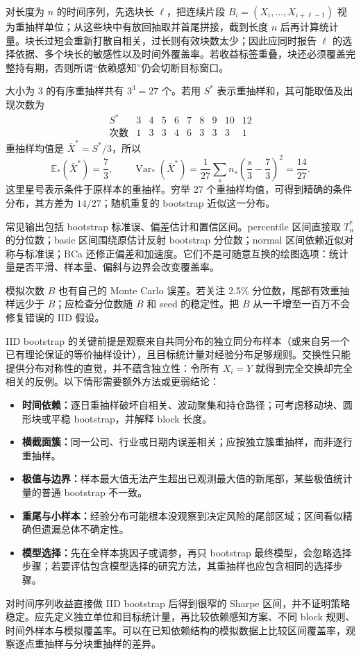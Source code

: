 对长度为 $n$ 的时间序列，先选块长 $\ell$，把连续片段
$B_i=(X_i,\ldots,X_{i+\ell-1})$ 视为重抽样单位；从这些块中有放回抽取并首尾拼接，截到长度 $n$ 后再计算统计量。块长过短会重新打散自相关，过长则有效块数太少；因此应同时报告 $\ell$ 的选择依据、多个块长的敏感性以及时间外覆盖率。若收益标签重叠，块还必须覆盖完整持有期，否则所谓“依赖感知”仍会切断目标窗口。


大小为 3 的有序重抽样共有 $3^3=27$ 个。若用 $S^*$ 表示重抽样和，其可能取值及出现次数为
\[
\begin{array}{c|rrrrrrrrr}
S^*&3&4&5&6&7&8&9&10&12\\\hline
\text{次数}&1&3&3&4&6&3&3&3&1
\end{array}
\]
重抽样均值是 $\bar X^*=S^*/3$，所以
\[
  \mathbb E_*(\bar X^*)=\frac73,
  \qquad
  \operatorname{Var}_*(\bar X^*)
  =\frac1{27}\sum_s n_s\left(\frac{s}{3}-\frac73\right)^2
  =\frac{14}{27}.
\]
这里星号表示条件于原样本的重抽样。穷举 27 个重抽样均值，可得到精确的条件分布，其方差为 $14/27$；随机重复的 bootstrap 近似这一分布。


常见输出包括 bootstrap 标准误、偏差估计和置信区间。percentile 区间直接取 $T_n^*$ 的分位数；basic 区间围绕原估计反射 bootstrap 分位数；normal 区间依赖近似对称与标准误；BCa 还修正偏差和加速度。它们不是可随意互换的绘图选项：统计量是否平滑、样本量、偏斜与边界会改变覆盖率。

模拟次数 $B$ 也有自己的 Monte Carlo 误差。若关注 2.5\% 分位数，尾部有效重抽样远少于 $B$；应检查分位数随 $B$ 和 seed 的稳定性。把 $B$ 从一千增至一百万不会修复错误的 IID 假设。


IID bootstrap 的关键前提是观察来自共同分布的独立同分布样本（或来自另一个已有理论保证的等价抽样设计），且目标统计量对经验分布足够规则。交换性只能提供分布对称性的直觉，并不蕴含独立性：令所有 $X_i=Y$ 就得到完全交换却完全相关的反例。以下情形需要额外方法或更弱结论：
\begin{itemize}[nosep,leftmargin=*]
  \item \textbf{时间依赖：}逐日重抽样破坏自相关、波动聚集和持仓路径；可考虑移动块、圆形块或平稳 bootstrap，并解释 block 长度。
  \item \textbf{横截面簇：}同一公司、行业或日期内误差相关；应按独立簇重抽样，而非逐行重抽样。
  \item \textbf{极值与边界：}样本最大值无法产生超出已观测最大值的新尾部，某些极值统计量的普通 bootstrap 不一致。
  \item \textbf{重尾与小样本：}经验分布可能根本没观察到决定风险的尾部区域；区间看似精确但遗漏总体不确定性。
  \item \textbf{模型选择：}先在全样本挑因子或调参，再只 bootstrap 最终模型，会忽略选择步骤；若要评估包含模型选择的研究方法，其重抽样也应包含相同的选择步骤。
\end{itemize}
对时间序列收益直接做 IID bootstrap 后得到很窄的 Sharpe 区间，并不证明策略稳定。应先定义独立单位和目标统计量，再比较依赖感知方案、不同 block 规则、时间外样本与模拟覆盖率。可以在已知依赖结构的模拟数据上比较区间覆盖率，观察逐点重抽样与分块重抽样的差异。

